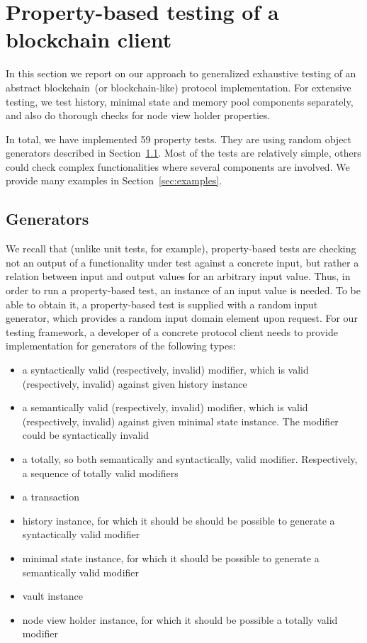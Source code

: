 
\section{Property-based testing of a blockchain client}
\label{sec:props}

In this section we report on our approach to generalized exhaustive testing of an abstract blockchain~(or blockchain-like) protocol implementation. For extensive testing, we test history, minimal state and memory pool components separately, and also do thorough checks for node view holder properties.
	
In total, we have implemented 59 property tests. They are using random object generators described in Section~\ref{sec:generators}. Most of the tests are relatively simple, others could check complex functionalities where several components are involved. We provide many examples in Section~\ref{sec:examples}.

\subsection{Generators}
\label{sec:generators}

We recall that (unlike unit tests, for example), property-based tests are checking not an output of a functionality under test against a concrete input, but rather a relation between input and output values for an arbitrary input value. Thus, in order to run a property-based test, an instance of an input value is needed. To be able to obtain it, a property-based test is supplied with a random input generator, which provides a random input domain element upon request. For our testing framework, a developer of a concrete protocol client needs to provide implementation for generators of the following types:

\begin{itemize}
	\item{a syntactically valid (respectively, invalid) modifier, which is valid (respectively, invalid) against given history instance}
	\item{a semantically valid (respectively, invalid) modifier, which is valid (respectively, invalid) against given minimal state instance. The modifier could be syntactically invalid}
	\item{a totally, so both semantically and syntactically, valid modifier. Respectively, a sequence of totally valid modifiers}
	\item{a transaction}
	\item{history instance, for which it should be should be possible to generate a syntactically valid modifier}
	\item{minimal state instance, for which it should be possible to generate a semantically valid modifier}
	\item{vault instance}
	\item{node view holder instance, for which it should be possible a totally valid modifier}
\end{itemize}

